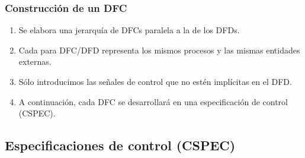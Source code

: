 \subsubsection{Construcción de un DFC}
\begin{enumerate}
    \item Se elabora una jerarquía de DFCs paralela a la de los DFDs.
    \item Cada para DFC/DFD representa los mismos procesos y las mismas entidades externas.
    \item Sólo introducimos las señales de control que no estén implícitas en el DFD.
    \item A continuación, cada DFC se desarrollará en una especificación de control (CSPEC).
\end{enumerate}


\subsection{Especificaciones de control (CSPEC)}

